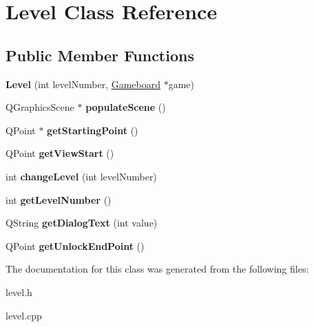 \hypertarget{class_level}{}\section{Level Class Reference}
\label{class_level}
\subsection*{Public Member Functions}
\begin{DoxyCompactItemize}
\item 
\hypertarget{class_level_a88a7dfc5743b8beda252398ab1676f39}{}{\bfseries Level} (int level\+Number, \hyperlink{class_gameboard}{Gameboard} $\ast$game)\label{class_level_a88a7dfc5743b8beda252398ab1676f39}

\item 
\hypertarget{class_level_a898937cdec40914b45ecb23649cd5e2a}{}Q\+Graphics\+Scene $\ast$ {\bfseries populate\+Scene} ()\label{class_level_a898937cdec40914b45ecb23649cd5e2a}

\item 
\hypertarget{class_level_ae7176d05829097956f8ba57fcd4155dc}{}Q\+Point $\ast$ {\bfseries get\+Starting\+Point} ()\label{class_level_ae7176d05829097956f8ba57fcd4155dc}

\item 
\hypertarget{class_level_aa1d6d7b228f5b64d697c0cd3666ea836}{}Q\+Point {\bfseries get\+View\+Start} ()\label{class_level_aa1d6d7b228f5b64d697c0cd3666ea836}

\item 
\hypertarget{class_level_a1a34f3b2d48e3b1e11b864108cd08ddf}{}int {\bfseries change\+Level} (int level\+Number)\label{class_level_a1a34f3b2d48e3b1e11b864108cd08ddf}

\item 
\hypertarget{class_level_afbf573a6aecae9cba02d7398e5637dd5}{}int {\bfseries get\+Level\+Number} ()\label{class_level_afbf573a6aecae9cba02d7398e5637dd5}

\item 
\hypertarget{class_level_a88af9e3a9a86d7692f665fe6d781ec17}{}Q\+String {\bfseries get\+Dialog\+Text} (int value)\label{class_level_a88af9e3a9a86d7692f665fe6d781ec17}

\item 
\hypertarget{class_level_a25c74d7cf455e332d9aca192136b0c1b}{}Q\+Point {\bfseries get\+Unlock\+End\+Point} ()\label{class_level_a25c74d7cf455e332d9aca192136b0c1b}

\end{DoxyCompactItemize}


The documentation for this class was generated from the following files\+:\begin{DoxyCompactItemize}
\item 
level.\+h\item 
level.\+cpp\end{DoxyCompactItemize}
